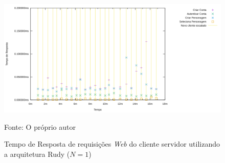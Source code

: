 \begin{figure}[htb!]
    \caption{Tempo de Resposta de requisições \textit{Web} do cliente servidor utilizando a arquitetura Rudy ($N=1$)}
    \label{fig:rudy_t4_reqs_https}
    \includegraphics[width=\textwidth]{metricas_rudy_t4/rudyc_http.png}
    \centering
    
    Fonte: O próprio autor
\end{figure}

